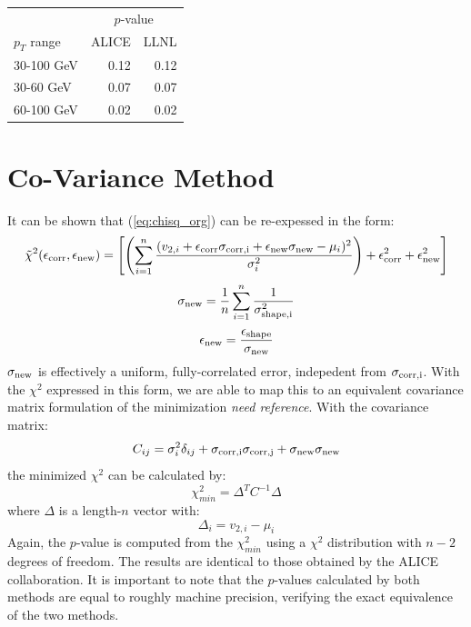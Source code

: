 \documentclass[11pt]{article}
\begin{document}
\begin{center}
\begin{tabular}{ l r r }
  & \multicolumn{2}{c}{$p$-value} \\
$p_T$ range & ALICE & LLNL \\
\hline
30-100 GeV & 0.12 & 0.12 \\ 
30-60 GeV & 0.07 & 0.07 \\ 
60-100 GeV & 0.02 & 0.02 \\
\end{tabular}
\end{center}

\section{Co-Variance Method}

It can be shown that (\ref{eq:chisq_org}) can be re-expessed in the form:
\begin{equation}\label{chisq_eff}
    \tilde{\chi}^2 (\epsilon_{\rm corr}, \epsilon_{\rm new}) = \left[ \left( \sum_{i=1}^{n} \frac{(v_{2, i} + \epsilon_{\rm corr} \sigma_{\rm corr, i} + \epsilon_{\rm new} \sigma_{\rm new} - \mu_i)^2}{\sigma^2_i} \right)+ \epsilon_{\rm corr}^2 + \epsilon_{\rm new}^2 \right]
\end{equation}
\begin{equation}\label{sigma_new}
    \sigma_{\rm new} = \frac{1}{n}\sum_{i=1}^{n} \frac{1}{\sigma^2_{\rm shape, i}}
\end{equation}
\begin{equation}\label{eps_new}
    \epsilon_{\rm new} = \frac{\epsilon_{\rm shape}}{\sigma_{\rm new}}
\end{equation}
$\sigma_{\rm new}$ is effectively a uniform, fully-correlated error, indepedent from $\sigma_{\rm corr, i}$. With the $\chi^2$ expressed in this form, we are able to map this to an equivalent covariance matrix formulation of the minimization {\it need reference}. With the covariance matrix:
\begin{equation}\label{covariance_matrix}
    C_{ij} = \sigma_i^2 \delta_{ij} + \sigma_{\rm corr, i} \sigma_{\rm corr, j} + \sigma_{\rm new} \sigma_{\rm new}
\end{equation}
the minimized $\chi^2$ can be calculated by:
\begin{equation}\label{cov_mat_chi2_min}
    \chi_{min}^2 = \Delta^T C^{-1} \Delta
\end{equation}
where $\Delta$ is a length-$n$ vector with:
\begin{equation}\label{delta_def}
    \Delta_i = v_{2, i} - \mu_i
\end{equation}
Again, the $p$-value is computed from the $\chi_{min}^2$ using a $\chi^2$ distribution with $n - 2$ degrees of freedom. The results are identical to those obtained by the ALICE collaboration. It is important to note that the $p$-values calculated by both methods are equal to roughly machine precision, verifying the exact equivalence of the two methods.
\end{document}
